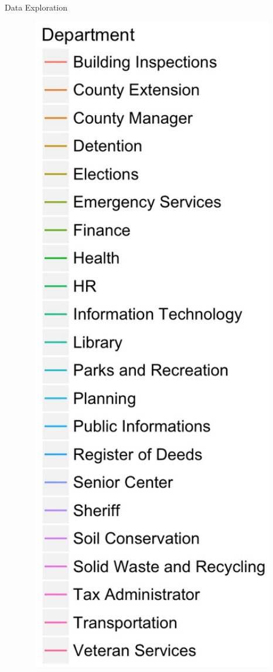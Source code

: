 \documentclass[10pt, xcolor=table]{beamer}
\theoremstyle{definition}
\theoremstyle{remark}
\begin{document}
\begin{frame}{Data Exploration}
\begin{center}
\begin{minipage}{0.13\linewidth}
\begin{figure}
	 		 		 	\includegraphics[width=1.25\textwidth]{figures/Dept2.jpg}
	 \end{figure}
	\end{minipage}
\end{center}
\end{frame}
\end{document}
